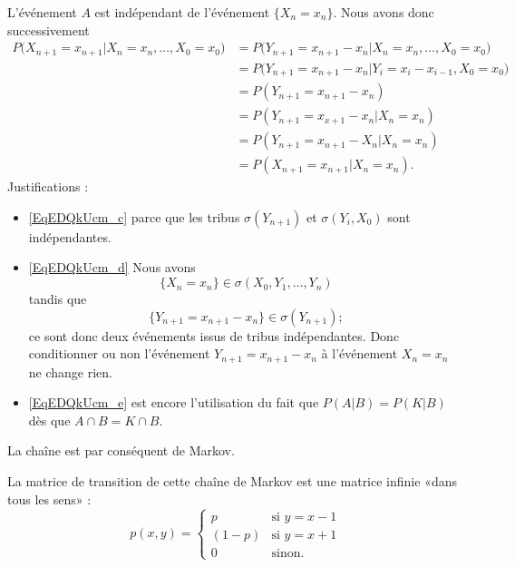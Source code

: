 L'événement \( A\) est indépendant de l'événement \( \{ X_n=x_n \}\). Nous avons donc successivement
\begin{subequations}
    \begin{align}
        P\big( X_{n+1}=x_{n+1}| X_n=x_n,\ldots,X_0=x_0 \big)&=P\big( Y_{n+1}=x_{n+1}-x_n| X_n=x_n,\ldots,X_0=x_0 \big)\\
        &=P\big( Y_{n+1}=x_{n+1}-x_n|  Y_i=x_i-x_{i-1},X_0=x_0\big)\\
        &=P(Y_{n+1}=x_{n+1}-x_n)        \label{EqEDQkUcm_c}\\
        &=P(Y_{n+1}=x_{x+1}-x_n|X_n=x_n)    \label{EqEDQkUcm_d}\\
        &=P(Y_{n+1}=x_{n+1}-X_n|X_n=x_n)        \label{EqEDQkUcm_e}\\
        &=P(X_{n+1}=x_{n+1}|X_n=x_n).
    \end{align}
\end{subequations}
Justifications :
\begin{itemize}
    \item \eqref{EqEDQkUcm_c} parce que les tribus $\sigma(Y_{n+1})$ et \( \sigma(Y_i,X_0)\) sont indépendantes.
    \item \eqref{EqEDQkUcm_d} Nous avons
        \begin{equation}
    \{ X_n=x_n \}\in\sigma(X_0,Y_1,\ldots, Y_n)
\end{equation}
tandis que
\begin{equation}
    \{ Y_{n+1}=x_{n+1}-x_n \}\in\sigma(Y_{n+1});
\end{equation}
ce sont donc deux événements issus de tribus indépendantes. Donc conditionner ou non l'événement \( Y_{n+1}=x_{n+1}-x_n\) à l'événement \( X_n=x_n\) ne change rien.
\item \eqref{EqEDQkUcm_e} est encore l'utilisation du fait que \( P(A|B)=P(K|B)\) dès que \( A\cap B=K\cap B\).

\end{itemize}

La chaîne est par conséquent de Markov.

La matrice de transition de cette chaîne de Markov est une matrice infinie «dans tous les sens» :
\begin{equation}
    p(x,y)=\begin{cases}
        p    &   \text{si $y=x-1$}\\
        (1-p)    &    \text{si $y=x+1$}\\
        0    &   \text{sinon}.
    \end{cases}
\end{equation}

